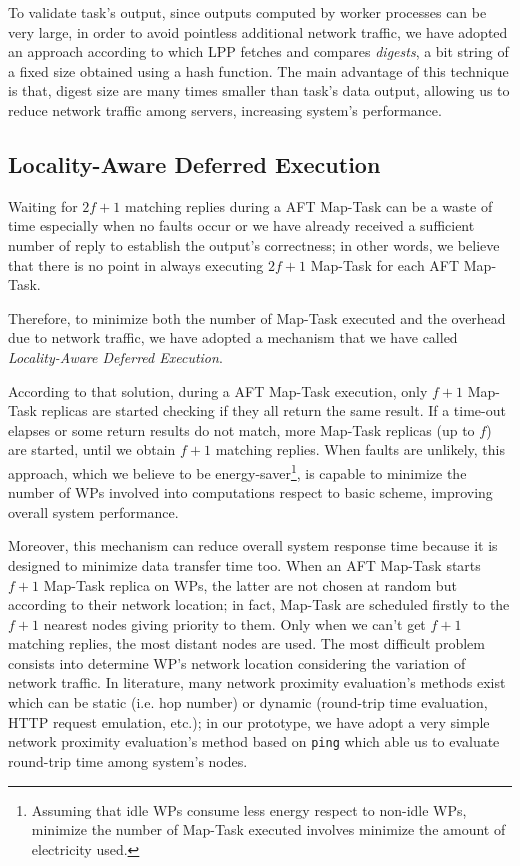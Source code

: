 \documentclass[sigchi]{acmart}
\begin{document}
To validate task's output, since outputs computed by worker processes can be very large, in order to avoid pointless additional network traffic, we have adopted an approach according to which LPP fetches and compares \textit{digests}, a bit string of a fixed size obtained using a hash function. The main advantage of this technique is that, digest size are many times smaller than task's data output, allowing us to reduce network traffic among servers, increasing system's performance.

\subsection{Locality-Aware Deferred Execution} 

Waiting for $2f + 1$ matching replies during a AFT Map-Task can be a waste of time especially when no faults occur or we have already received a sufficient number of reply to establish the output's correctness; in other words, we believe that there is no point in always executing $2f + 1$ Map-Task for each AFT Map-Task.

Therefore, to minimize both the number of Map-Task executed and the overhead due to network traffic, we have adopted a mechanism that we have called \textit{Locality-Aware Deferred Execution}. 

According to that solution, during a AFT Map-Task execution, only $f + 1$ Map-Task replicas are started checking if they all return the same result. If a time-out elapses or some return results do not match, more Map-Task replicas (up to $f$) are started, until we obtain $f + 1$ matching replies. When faults are unlikely, this approach, which we believe to be energy-saver\footnote{Assuming that idle WPs consume less energy respect to non-idle WPs, minimize the number of Map-Task executed involves minimize the amount of electricity used.}, is capable to minimize the number of WPs involved into computations respect to basic scheme, improving overall system performance.

Moreover, this mechanism can reduce overall system response time because it is designed to minimize data transfer time too. When an AFT Map-Task starts $f + 1$ Map-Task replica on WPs, the latter are not chosen at random but according to their network location; in fact, Map-Task are scheduled firstly to the $f + 1$ nearest nodes giving priority to them. Only when we can't get $f + 1$ matching replies, the most distant nodes are used. The most difficult problem consists into determine WP's network location considering the variation of network traffic. In literature, many network proximity evaluation's methods exist which can be static (i.e. hop number) or dynamic (round-trip time evaluation, HTTP request emulation, etc.); in our prototype, we have adopt a very simple network proximity evaluation's method based on \texttt{ping} which able us to evaluate round-trip time among system's nodes. 
\end{document}

